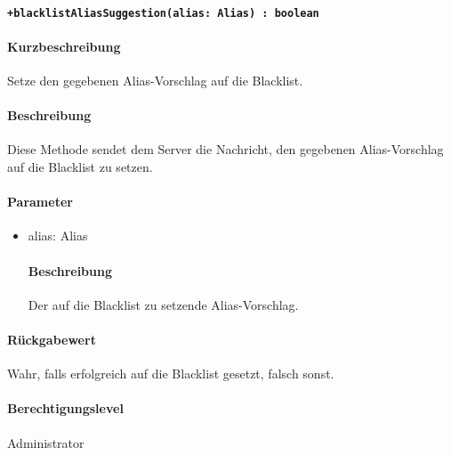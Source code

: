 \paragraph{\texttt{+blacklistAliasSuggestion(alias: Alias) : boolean}}%
\paragraph*{Kurzbeschreibung}
Setze den gegebenen Alias-Vorschlag auf die Blacklist.
\paragraph*{Beschreibung}
Diese Methode sendet dem Server die Nachricht, den gegebenen Alias-Vorschlag auf die Blacklist zu setzen.
\paragraph*{Parameter}
\begin{itemize}
    \item alias: Alias
            \paragraph*{Beschreibung}
            Der auf die Blacklist zu setzende Alias-Vorschlag.
\end{itemize}
\paragraph*{Rückgabewert}
Wahr, falls erfolgreich auf die Blacklist gesetzt, falsch sonst.
\paragraph*{Berechtigungslevel}
Administrator